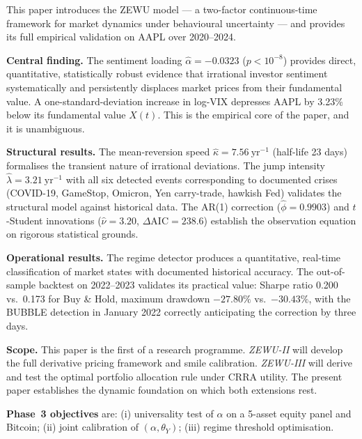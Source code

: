 \documentclass[12pt,a4paper]{article}
\theoremstyle{definition}
\theoremstyle{remark}
\begin{document}
This paper introduces the ZEWU model --- a two-factor continuous-time
framework for market dynamics under behavioural uncertainty --- and
provides its full empirical validation on AAPL over 2020--2024.

\textbf{Central finding.} The sentiment loading $\hat{\alpha} = -0.0323$
($p < 10^{-8}$) provides direct, quantitative, statistically robust
evidence that irrational investor sentiment systematically and
persistently displaces market prices from their fundamental value. A
one-standard-deviation increase in log-VIX depresses AAPL by 3.23\%
below its fundamental value $X(t)$. This is the empirical core of the
paper, and it is unambiguous.

\textbf{Structural results.} The mean-reversion speed $\hat{\kappa} =
7.56~\text{yr}^{-1}$ (half-life 23 days) formalises the transient nature
of irrational deviations. The jump intensity $\hat{\lambda} = 3.21~
\text{yr}^{-1}$ with all six detected events corresponding to documented
crises (COVID-19, GameStop, Omicron, Yen carry-trade, hawkish Fed)
validates the structural model against historical data. The AR(1)
correction ($\hat{\phi} = 0.9903$) and $t$-Student innovations
($\hat{\nu} = 3.20$, $\Delta\text{AIC} = 238.6$) establish the
observation equation on rigorous statistical grounds.

\textbf{Operational results.} The regime detector produces a
quantitative, real-time classification of market states with documented
historical accuracy. The out-of-sample backtest on 2022--2023 validates
its practical value: Sharpe ratio 0.200 vs.\ 0.173 for Buy \& Hold,
maximum drawdown $-27.80\%$ vs.\ $-30.43\%$, with the BUBBLE detection
in January 2022 correctly anticipating the correction by three days.

\textbf{Scope.} This paper is the first of a research programme.
\emph{ZEWU-II} will develop the full derivative pricing framework and
smile calibration. \emph{ZEWU-III} will derive and test the optimal
portfolio allocation rule under CRRA utility. The present paper
establishes the dynamic foundation on which both extensions rest.

\textbf{Phase~3 objectives} are: (i) universality test of $\alpha$
on a 5-asset equity panel and Bitcoin; (ii) joint calibration of
$(\alpha, \theta_Y)$; (iii) regime threshold optimisation.
\end{document}
